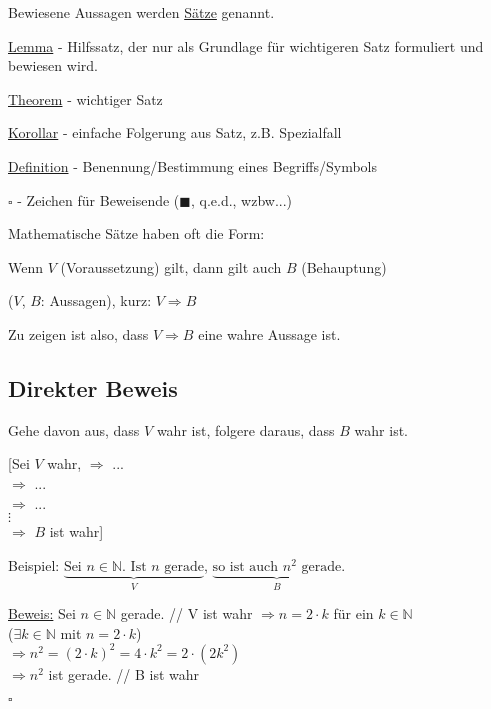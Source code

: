 \documentclass[a4paper, 12pt, twoside] {article}
\begin{document}
Bewiesene Aussagen werden \underline{Sätze} genannt.

\hfill

\underline{Lemma} - Hilfssatz, der nur als Grundlage für wichtigeren Satz formuliert und bewiesen wird.

\underline{Theorem} - wichtiger Satz

\underline{Korollar} - einfache Folgerung aus Satz, z.B. Spezialfall

\underline{Definition} - Benennung/Bestimmung eines Begriffs/Symbols

$\square$ - Zeichen für Beweisende ($\blacksquare$, q.e.d., wzbw...)

\hfill

Mathematische Sätze haben oft die Form:

Wenn $V$ (Voraussetzung) gilt, dann gilt auch $B$ (Behauptung)

($V$, $B$: Aussagen), kurz: $V \Rightarrow B$

Zu zeigen ist also, dass $V \Rightarrow B$ eine wahre Aussage ist.

\subsection{Direkter Beweis} %

Gehe davon aus, dass $V$ wahr ist, folgere daraus, dass $B$ wahr ist.

[\space\space Sei $V$ wahr, $\Rightarrow$ ... \\
\text{\qquad\qquad\qquad} $\Rightarrow$ ... \\
\text{\qquad\qquad\qquad} $\Rightarrow$ ... \\
\text{\qquad\qquad\qquad} \space $\vdots$ \\
\text{\qquad\qquad\qquad} $\Rightarrow$ $B$ ist wahr\space\space]

Beispiel: $\underbrace{\text{Sei $n \in \mathbb{N}$. Ist $n$ gerade}}_{V}$, $\underbrace{\text{so ist auch $n^2$ gerade}}_{B}.$

\underline{Beweis:} Sei $n \in \mathbb{N}$ gerade. \hfill // V ist wahr
$\Rightarrow n = 2 \cdot k$ für ein $k \in \mathbb{N}$ \\
\text{\qquad\qquad} ($\exists k \in \mathbb{N}$ mit $n = 2 \cdot k$) \\
$\Rightarrow n^2 = (2 \cdot k)^2 = 4 \cdot k^2 = 2 \cdot (2k^2)$ \\
$\Rightarrow n^2$ ist gerade. \hfill // B ist wahr

\hfill $\square$
\end{document}
